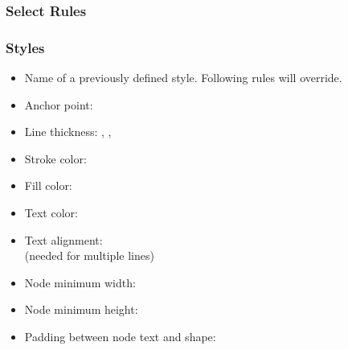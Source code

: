 \subsubsection{Select Rules}
\begin{frame}[fragile]
  \frametitle{Styles }
  \vspace{3mm}
  \begin{itemize}
    \pause
    \item Name of a previously defined style. Following rules will override.
    \pause
    \item Anchor point: 
    \pause
    \item Line thickness: , , 
    \item Stroke color: 
    \item Fill color: 
    \item Text color: 
    \pause
    \item Text alignment:  \\
          (needed for multiple lines)
    \item Node minimum width: 
    \item Node minimum height: 
    \pause
    \item Padding between node text and shape: 
  \end{itemize}
\end{frame}

%  


